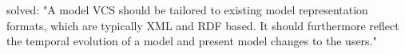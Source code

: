 
solved:
"A model VCS should be tailored to existing model representation formats, which are typically XML and RDF based. It should furthermore reflect the temporal evolution of a model and present model changes to the users." \citep{Waltemath2013}